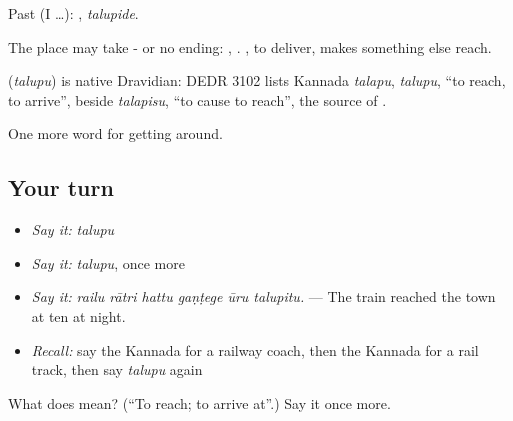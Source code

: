 Past (I …): , \emph{talupide}.

The place may take - or no ending:  ,  . , to deliver, makes something else reach.

\begin{cousinweb}
\textbf{} (\emph{talupu}) is native Dravidian: DEDR 3102 lists Kannada \emph{talapu}, \emph{talupu}, \textquotedblleft{}to reach, to arrive\textquotedblright{}, beside \emph{talapisu}, \textquotedblleft{}to cause to reach\textquotedblright{}, the source of .
\end{cousinweb}

\begin{grammarlens}[title={What you've built}]
One more word for getting around.
\end{grammarlens}

\subsection*{Your turn}
\begin{itemize}
\raggedright
  \item \emph{Say it:} \emph{talupu}
  \item \emph{Say it:} \emph{talupu}, once more
  \item \emph{Say it:} \emph{railu rātri hattu gaṇṭege ūru talupitu.} — The train reached the town at ten at night.
  \item \emph{Recall:} say the Kannada for a railway coach, then the Kannada for a rail track, then say \emph{talupu} again
\end{itemize}

\begin{tcolorbox}[breakable,colback=teal!4,colframe=teal!35!black,title={Before you move on}]
What does  mean? (\textquotedblleft{}To reach; to arrive at\textquotedblright{}.) Say it once more.
\end{tcolorbox}
